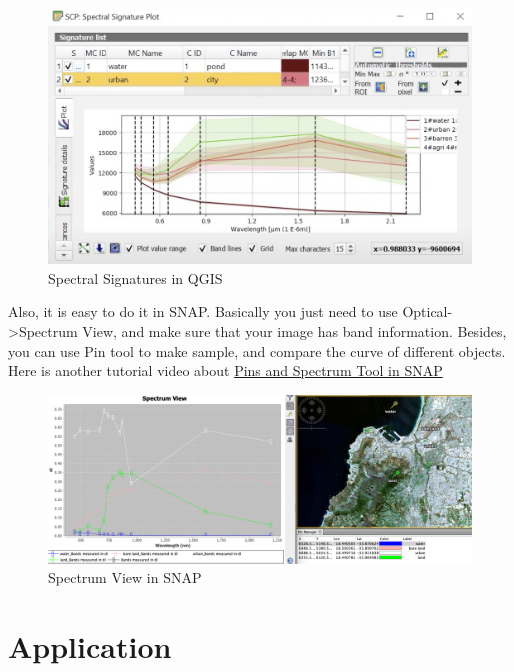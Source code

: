 \documentclass[
  letterpaper,
  DIV=11,
  numbers=noendperiod]{scrreprt}
\begin{document}
\begin{figure}

{\centering \includegraphics{./image/spectral signature.png}

}

\caption{Spectral Signatures in QGIS}

\end{figure}

Also, it is easy to do it in SNAP. Basically you just need to use
Optical-\textgreater Spectrum View, and make sure that your image has
band information. Besides, you can use Pin tool to make sample, and
compare the curve of different objects. Here is another tutorial video
about \href{https://www.youtube.com/watch?v=5znAQH6vrLs}{Pins and
Spectrum Tool in SNAP}

\begin{figure}

{\centering \includegraphics{./image/SNAP1.png}

}

\caption{Spectrum View in SNAP}

\end{figure}

\hypertarget{application}{%
\section{Application}\label{application}}
\end{document}
